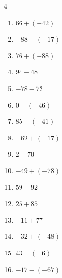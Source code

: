 \begin{multicols}{4}
\begin{enumerate}
        \phantom{$=104$}

  \item $66+(-42)$

        \phantom{$=24$}

  \item $-88-(-17)$

        \phantom{$=-71$}

  \item $76+(-88)$

        \phantom{$=-12$}

  \item $94-48$

        \phantom{$=46$}

  \item $-78-72$

        \phantom{$=-150$}

  \item $0-(-46)$

        \phantom{$=46$}

  \item $85-(-41)$

        \phantom{$=126$}

  \item $-62+(-17)$

        \phantom{$=-79$}

  \item $2+70$

        \phantom{$=72$}

  \item $-49+(-78)$

        \phantom{$=-127$}

  \item $59-92$

        \phantom{$=-33$}

\columnbreak %

  \item $25+85$

        \phantom{$=110$}

  \item $-11+77$

        \phantom{$=66$}

  \item $-32+(-48)$

        \phantom{$=-80$}

  \item $43-(-6)$

        \phantom{$=49$}

  \item $-17-(-67)$


\end{enumerate}
\end{multicols}
